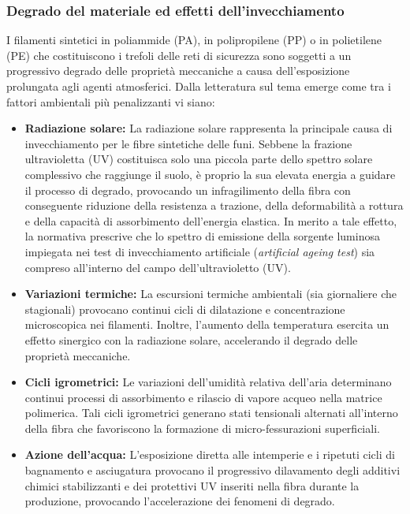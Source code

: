 \subsubsection{Degrado del materiale ed effetti dell'invecchiamento}
I filamenti sintetici in poliammide (PA), in polipropilene (PP) o in polietilene (PE) che costituiscono i trefoli delle reti di sicurezza sono soggetti a un progressivo degrado delle proprietà meccaniche a causa dell'esposizione prolungata agli agenti atmosferici. Dalla letteratura sul tema emerge come tra i fattori ambientali più penalizzanti vi siano: 
\begin{itemize}
    \item \textbf{Radiazione solare:} La radiazione solare rappresenta la principale causa di invecchiamento per le fibre sintetiche delle funi. Sebbene la frazione ultravioletta (UV) costituisca solo una piccola parte dello spettro solare complessivo che raggiunge il suolo, è proprio la sua elevata energia a guidare il processo di degrado, provocando un infragilimento della fibra con conseguente riduzione della resistenza a trazione, della deformabilità a rottura e della capacità di assorbimento dell'energia elastica. In merito a tale effetto, la normativa prescrive che lo spettro di emissione della sorgente luminosa impiegata nei test di invecchiamento artificiale (\textit{artificial ageing test}) sia compreso all'interno del campo dell'ultravioletto (UV).
    \item \textbf{Variazioni termiche:} La escursioni termiche ambientali (sia giornaliere che stagionali) provocano continui cicli di dilatazione e concentrazione microscopica nei filamenti. Inoltre, l'aumento della temperatura esercita un effetto sinergico con la radiazione solare, accelerando il degrado delle proprietà meccaniche. 
    \item \textbf{Cicli igrometrici:} Le variazioni dell'umidità relativa dell'aria determinano continui processi di assorbimento e rilascio di vapore acqueo nella matrice polimerica. Tali cicli igrometrici generano stati tensionali alternati all'interno della fibra che favoriscono la formazione di micro-fessurazioni superficiali. 
    \item \textbf{Azione dell'acqua:} L'esposizione diretta alle intemperie e i ripetuti cicli di bagnamento e asciugatura provocano il progressivo dilavamento degli additivi chimici stabilizzanti e dei protettivi UV inseriti nella fibra durante la produzione, provocando l'accelerazione dei fenomeni di degrado. 
\end{itemize}

